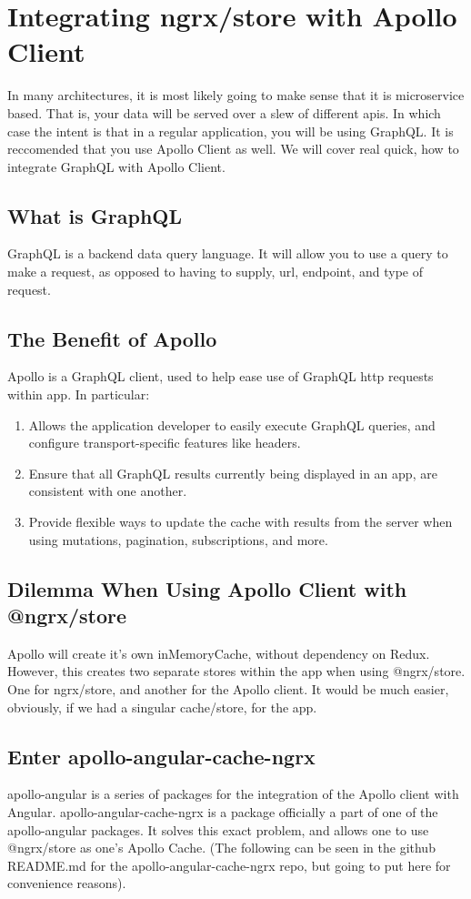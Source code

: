 
\section{ Integrating ngrx/store with Apollo Client }
In many architectures, it is most likely going to make sense that it is
microservice based. That is, your data will be served over a slew of different
apis. In which case the intent is that in a regular application, you will be
using GraphQL. It is reccomended that you use Apollo Client as well. We will
cover real quick, how to integrate GraphQL with Apollo Client.

\subsection{ What is GraphQL }
GraphQL is a backend data query language. It will allow you to use a query to
make a request, as opposed to having to supply, url, endpoint, and type of
request.

\subsection{ The Benefit of Apollo }
Apollo is a GraphQL client, used to help ease use of GraphQL http requests
within app. In particular:
\begin{enumerate}
  \item Allows the application developer to easily execute GraphQL queries, and
  configure transport-specific features like headers.
  \item Ensure that all GraphQL results currently being displayed in an app, are
   consistent with one another.
  \item Provide flexible ways to update the cache with results from the server
  when using mutations, pagination, subscriptions, and more.
\end{enumerate}

\subsection{ Dilemma When Using Apollo Client with @ngrx/store }
Apollo will create it’s own inMemoryCache, without dependency on Redux. However,
this creates two separate stores within the app when using @ngrx/store.
One for ngrx/store, and another for the Apollo client. It would be much easier,
obviously, if we had a singular cache/store, for the app.

\subsection{ Enter apollo-angular-cache-ngrx }
apollo-angular is a series of packages for the integration of the Apollo client
with Angular. apollo-angular-cache-ngrx is a package officially a part of one of
the apollo-angular packages. It solves this exact problem, and allows one to use
@ngrx/store as one’s Apollo Cache. (The following can be seen in the github
README.md for the apollo-angular-cache-ngrx repo, but going to put here for
convenience reasons).

